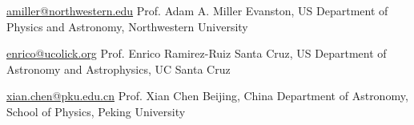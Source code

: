 


\begin{cvreferences}
	
\cvreference
	{\href{mailto:amiller@northwestern.edu}{\faEnvelope\acvHeaderIconSep amiller@northwestern.edu}} %
	{Prof. Adam A. Miller} %
	{Evanston, US} %
	{Department of Physics and Astronomy, Northwestern University} %


	
\cvreference
	{\href{mailto:enrico@ucolick.org}{\faEnvelope\acvHeaderIconSep enrico@ucolick.org}} %
	{Prof. Enrico Ramirez-Ruiz} %
	{Santa Cruz, US} %
	{Department of Astronomy and Astrophysics, UC Santa Cruz} %


\cvreference
	{\href{mailto:xian.chen@pku.edu.cn}{\faEnvelope\acvHeaderIconSep xian.chen@pku.edu.cn}} %
	{Prof. Xian Chen} %
	{Beijing, China} %
	{Department of Astronomy, School of Physics, Peking University} %
	
	
	




\end{cvreferences}